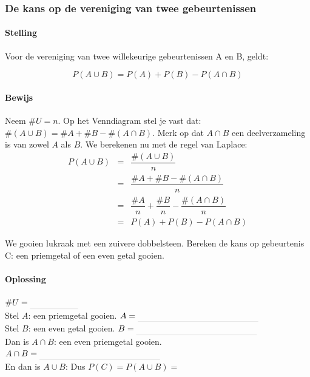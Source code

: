 \documentclass[12pt,twoside]{article}
\begin{document}
\pagebreak
\begin{samepage}
\subsubsection{De kans op de vereniging van twee gebeurtenissen}

\paragraph*{Stelling }Voor de vereniging van twee willekeurige gebeurtenissen A en B, geldt:\\
\begin{mdframed}
$$P(A \cup B) = P(A) + P(B) - P(A \cap B)$$
\end{mdframed}

\paragraph*{Bewijs}
\begin{center}
\end{center}
Neem $\#U = n$. Op het Venndiagram stel je vast dat: $\#(A\cup B)=\#A + \#B - \#(A\cap B)$. Merk op dat $A \cap B$ een deelverzameling is van zowel $A$ als $B$. We berekenen nu met de regel van Laplace:
\begin{eqnarray*}
  P(A \cup B) &=& \dfrac{\#(A \cup B)}{n}\\
              &=& \dfrac{\#A + \#B - \#(A\cap B)}{n}\\
              &=& \dfrac{\#A}{n} + \dfrac{\#B}{n} - \dfrac{\#(A\cap B)}{n}\\
              &=& P(A) + P(B) - P(A\cap B)
\end{eqnarray*}
\end{samepage}

\begin{oefening}
We gooien lukraak met een zuivere dobbelsteen. Bereken de kans op gebeurtenis C:
een priemgetal of een even getal gooien.
\paragraph*{Oplossing} $\#U=\arule{2cm}$\\
Stel $A$: een priemgetal gooien. $A=\arule{5cm}$\\
Stel $B$: een even getal gooien. $B=\arule{5cm}$\\
Dan is $A\cap B$: een even priemgetal gooien. $A\cap B=\arule{5cm}$\\
En dan is $A\cup B$: \arulefill
Dus $P(C)=P(A\cup B)=$
\end{oefening}
\end{document}
